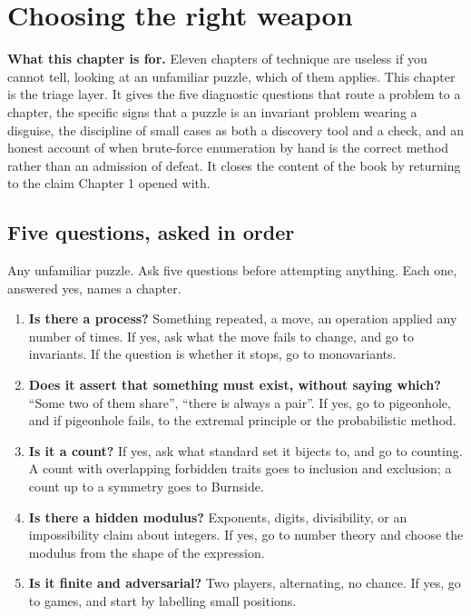 \chapter{Choosing the right weapon}

\begin{orient}
\textbf{What this chapter is for.} Eleven chapters of technique are useless if you cannot tell, looking at an unfamiliar puzzle, which of them applies. This chapter is the triage layer. It gives the five diagnostic questions that route a problem to a chapter, the specific signs that a puzzle is an invariant problem wearing a disguise, the discipline of small cases as both a discovery tool and a check, and an honest account of when brute-force enumeration by hand is the correct method rather than an admission of defeat. It closes the content of the book by returning to the claim Chapter 1 opened with.
\end{orient}

\section{Five questions, asked in order}

\cue Any unfamiliar puzzle.
\method Ask five questions before attempting anything. Each one, answered yes, names a chapter.

\begin{enumerate}[label=\textbf{\arabic*.},leftmargin=2.0em]
\item \textbf{Is there a process?} Something repeated, a move, an operation applied any number of times. If yes, ask what the move fails to change, and go to invariants. If the question is whether it stops, go to monovariants.
\item \textbf{Does it assert that something must exist, without saying which?} ``Some two of them share'', ``there is always a pair''. If yes, go to pigeonhole, and if pigeonhole fails, to the extremal principle or the probabilistic method.
\item \textbf{Is it a count?} If yes, ask what standard set it bijects to, and go to counting. A count with overlapping forbidden traits goes to inclusion and exclusion; a count up to a symmetry goes to Burnside.
\item \textbf{Is there a hidden modulus?} Exponents, digits, divisibility, or an impossibility claim about integers. If yes, go to number theory and choose the modulus from the shape of the expression.
\item \textbf{Is it finite and adversarial?} Two players, alternating, no chance. If yes, go to games, and start by labelling small positions.
\end{enumerate}

